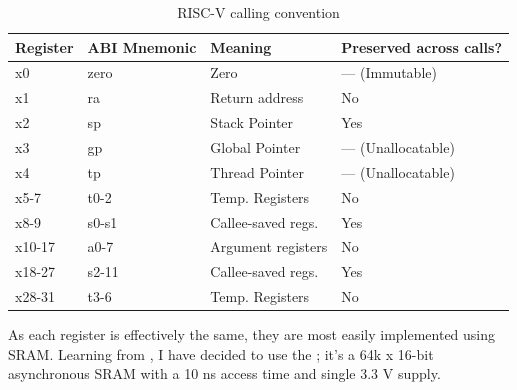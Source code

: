 \documentclass[a4paper, 11pt]{article}
\begin{document}
        \begin{table}[htb!]
            \centering
            \caption{RISC-V calling convention}\label{tab:Regs:CallConv}

            \begin{tabularx}{\textwidth}{
                >{\hsize=0.15\hsize\raggedright\arraybackslash}X
                >{\hsize=0.20\hsize\raggedright\arraybackslash}X
                >{\hsize=0.35\hsize\raggedright\arraybackslash}X
                >{\hsize=0.30\hsize\raggedright\arraybackslash}X
                }

                \toprule

                Register    &ABI Mnemonic   &Meaning    &Preserved across calls?    \\

                \midrule\addlinespace

                x0      &zero   &Zero     &--- (Immutable)                  \\
                x1      &ra     &Return address     &No                     \\
                x2      &sp     &Stack Pointer      &Yes                    \\
                x3      &gp     &Global Pointer     &--- (Unallocatable)    \\
                x4      &tp     &Thread Pointer     &--- (Unallocatable)    \\
                x5-7    &t0-2   &Temp. Registers    &No                     \\
                x8-9    &s0-s1  &Callee-saved regs. &Yes                    \\
                x10-17  &a0-7   &Argument registers &No                     \\
                x18-27  &s2-11  &Callee-saved regs. &Yes                    \\
                x28-31  &t3-6   &Temp. Registers    &No                     \\

                \bottomrule

            \end{tabularx}
        \end{table}

        As each register is effectively the same, they are most easily
        implemented using SRAM.
        Learning from \oldlonglogo, I have decided to use the \ramname 
        \cite{RegRAMChip}; it's a 64k x 16-bit asynchronous SRAM with a 10 ns 
        access time and single 3.3 V supply.
\end{document}
